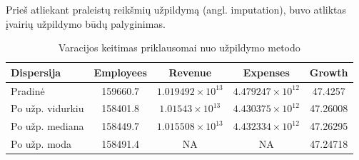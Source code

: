 Prieš atliekant praleistų reikšmių užpildymą (angl. imputation), buvo atliktas įvairių užpildymo būdų palyginimas.

\begin{table}[H]
	\centering
	\caption{Varacijos keitimas priklausomai nuo užpildymo metodo}
	\label{tab:dt-pre-analysis-2}
	\begin{tabular}{lcccc}
		\toprule
		Dispersija       & Employees & Revenue                     & Expenses                    & Growth   \\
		\midrule
		Pradinė          & 159660.7  & \(1.019492 \times 10^{13}\) & \(4.479247 \times 10^{12}\) & 47.4257  \\
		Po užp. vidurkiu & 158401.8  & \(1.01543 \times 10^{13}\)  & \(4.430375 \times 10^{12}\) & 47.26008 \\
		Po užp. mediana  & 158449.7  & \(1.015508 \times 10^{13}\) & \(4.432334 \times 10^{12}\) & 47.26295 \\
		Po užp. moda     & 158491.4  & NA                          & NA                          & 47.24718 \\
		\bottomrule
	\end{tabular}
\end{table}
